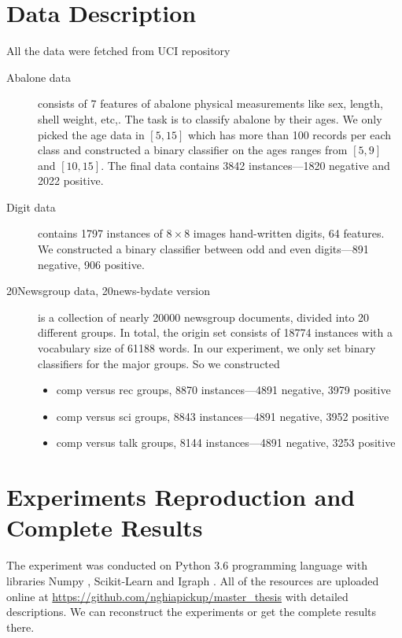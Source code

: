 \section*{Data Description}
All the data were fetched from UCI repository \parencite{Dua:2017}
\begin{description}
	\item[Abalone data] consists of 7 features of abalone physical measurements like sex, length, shell weight, etc,. The task is to classify abalone by their ages. We only picked the age data in $[5, 15]$ which has more than 100 records per each class and constructed a binary classifier on the ages ranges from $[5,9]$ and $[10, 15]$. The final data contains 3842 instances---1820 negative and 2022 positive.
	
	\item[Digit data] contains 1797 instances of $8 \times 8$ images hand-written digits, 64 features. We constructed a binary classifier between odd and even digits---891 negative, 906 positive.
		
	\item[20Newsgroup data, 20news-bydate version] is a collection of nearly 20000 newsgroup documents, divided into 20 different groups. In total, the origin set consists of 18774 instances with a vocabulary size of 61188 words. In our experiment, we only set binary classifiers for the major groups. So we constructed 
	\begin{itemize}
		\item comp versus rec groups, 8870 instances---4891 negative, 3979 positive
		\item comp versus sci groups, 8843 instances---4891 negative, 3952 positive
		\item comp versus talk groups, 8144 instances---4891 negative, 3253 positive
	\end{itemize}
\end{description}

\section*{Experiments Reproduction and Complete Results}
The experiment was conducted on Python 3.6 programming language \parencite{python3.6} with libraries Numpy \parencite{numpy}, Scikit-Learn \parencite{scikit-learn} and Igraph \parencite{Csardi2006}. All of the resources are uploaded online at \url{https://github.com/nghiapickup/master_thesis} with detailed descriptions. We can reconstruct the experiments or get the complete results there.